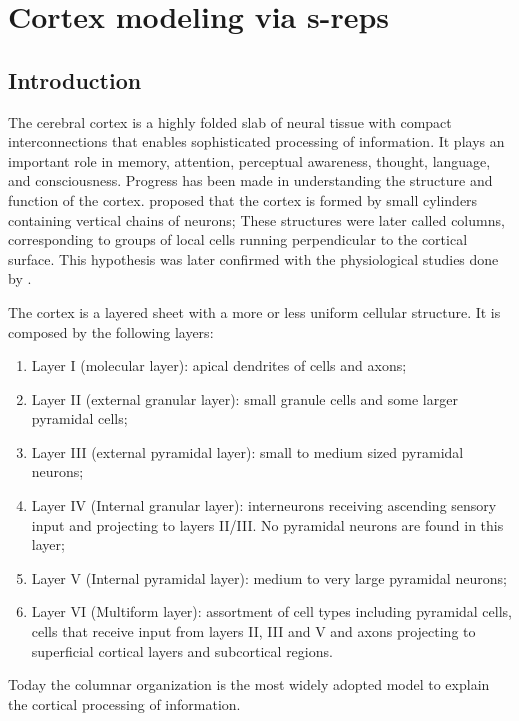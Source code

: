 
\graphicspath{{ChapterCortex/images/}}

\chapter{Cortex modeling via s-reps}
\label{chapter:cortexModeling}

\section{Introduction}
\label{sec:Introduction}

The cerebral cortex is a highly folded slab of neural tissue 
with compact interconnections that enables sophisticated processing of information.
It plays an important role in memory, attention, perceptual awareness, thought, language, and consciousness.
Progress has been made in understanding the structure and function of the cortex.
\cite{lorente1934studies} proposed that the cortex is formed by small cylinders containing vertical chains of neurons; 
These structures were later called columns, corresponding to groups of local cells running perpendicular to the cortical surface.
This hypothesis was later confirmed with the physiological studies done by \cite{mountcastle1998perceptual}. 

The cortex is a layered sheet with a more or less uniform cellular structure. 
It is composed by the following layers:
\begin{enumerate}
 \item Layer I (molecular layer): apical dendrites of cells and axons; 
 \item Layer II (external granular layer): small granule cells and some larger pyramidal cells;
 \item Layer III (external pyramidal layer): small to medium sized pyramidal neurons;
 \item Layer IV (Internal granular layer): interneurons receiving ascending sensory input and projecting to layers II/III. No pyramidal neurons are found in this layer;
 \item Layer V (Internal pyramidal layer): medium to very large pyramidal neurons; 
 \item Layer VI (Multiform layer): assortment of cell types including pyramidal cells, cells that receive input from layers II, III and V and 
       axons projecting to superficial cortical layers and subcortical regions.
\end{enumerate}
Today the columnar organization is the most widely adopted model to explain the cortical processing of information.

